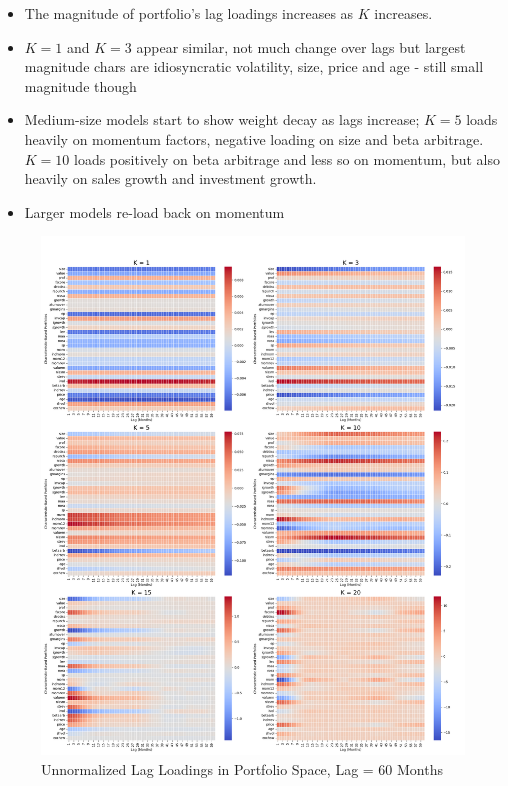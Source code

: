 \documentclass{article}
\begin{document}
\begin{itemize}
    \item The magnitude of portfolio's lag loadings increases as $K$ increases. 
    \item $K =1$ and $K =3$ appear similar, not much change over lags but largest magnitude chars are 
    idiosyncratic volatility, size, price and age - still small magnitude though
    \item Medium-size models start to show weight decay as lags increase; $K = 5$ loads heavily on momentum factors, 
    negative loading on size and beta arbitrage.$K = 10$ loads positively on beta arbitrage and less so on momentum, but also heavily on 
    sales growth and investment growth.
    \item Larger models re-load back on momentum
\end{itemize}

\begin{figure}[H]
    \centering
    \includegraphics[width=1\linewidth]{WB_60_unnorm.png}
    \caption{Unnormalized Lag Loadings in Portfolio Space, Lag = 60 Months}
    \label{fig:WB_60}
\end{figure}
\end{document}
